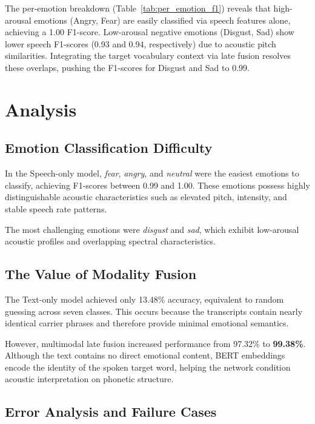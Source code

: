 \documentclass[11pt,journal,onecolumn]{IEEEtran}
\begin{document}
The per-emotion breakdown (Table~\ref{tab:per_emotion_f1}) reveals that high-arousal emotions (Angry, Fear) are easily classified via speech features alone, achieving a 1.00 F1-score. Low-arousal negative emotions (Disgust, Sad) show lower speech F1-scores (0.93 and 0.94, respectively) due to acoustic pitch similarities. Integrating the target vocabulary context via late fusion resolves these overlaps, pushing the F1-scores for Disgust and Sad to 0.99.

\newpage
\section{Analysis}

\subsection{Emotion Classification Difficulty}

In the Speech-only model, \textit{fear}, \textit{angry}, and \textit{neutral} were the easiest emotions to classify, achieving F1-scores between 0.99 and 1.00. These emotions possess highly distinguishable acoustic characteristics such as elevated pitch, intensity, and stable speech rate patterns.

The most challenging emotions were \textit{disgust} and \textit{sad}, which exhibit low-arousal acoustic profiles and overlapping spectral characteristics.

\subsection{The Value of Modality Fusion}

The Text-only model achieved only 13.48\% accuracy, equivalent to random guessing across seven classes. This occurs because the transcripts contain nearly identical carrier phrases and therefore provide minimal emotional semantics.

However, multimodal late fusion increased performance from 97.32\% to \textbf{99.38\%}. Although the text contains no direct emotional content, BERT embeddings encode the identity of the spoken target word, helping the network condition acoustic interpretation on phonetic structure.

\subsection{Error Analysis and Failure Cases}
\end{document}

